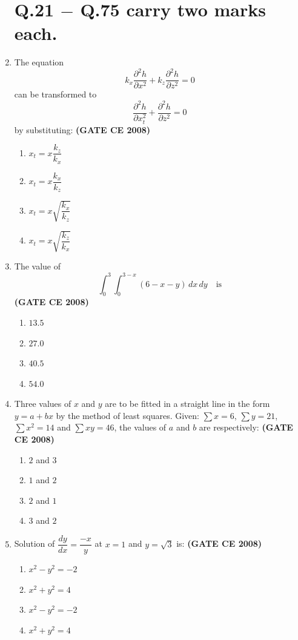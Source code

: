 \documentclass[journal]{IEEEtran}
\begin{document}
\begin{enumerate}
\section*{Q.21 $-$ Q.75 carry two marks each.}

\item The equation 
\[
k_x \frac{\partial^2 h}{\partial x^2} + k_z \frac{\partial^2 h}{\partial z^2} = 0
\]
can be transformed to \[
\frac{\partial^2 h}{\partial x_t^2} + \frac{\partial^2 h}{\partial z^2} = 0
\]
by substituting: \textbf{(GATE CE 2008)}
\begin{multicols}{2}
\begin{enumerate}
\item $x_t = x \dfrac{k_z}{k_x}$
\item $x_t = x \dfrac{k_x}{k_z}$
\item $x_t = x \sqrt{\dfrac{k_x}{k_z}}$
\item $x_t = x \sqrt{\dfrac{k_z}{k_x}}$
\end{enumerate}
\end{multicols}

\item The value of 
\[
\int_0^3 \int_0^{3-x} (6 - x - y) \, dx \, dy \quad \text{is}
\]
\textbf{(GATE CE 2008)}
\begin{multicols}{2}
\begin{enumerate}
\item $13.5$
\item $27.0$
\item $40.5$
\item $54.0$
\end{enumerate}
\end{multicols}

\item Three values of $x$ and $y$ are to be fitted in a straight line in the form $y = a + bx$ by the method of least squares. Given: $\sum x = 6$, $\sum y = 21$, $\sum x^2 = 14$ and $\sum xy = 46$, the values of $a$ and $b$ are respectively: \textbf{(GATE CE 2008)}
\begin{multicols}{2}
\begin{enumerate}
\item $2$ and $3$
\item $1$ and $2$
\item $2$ and $1$
\item $3$ and $2$
\end{enumerate}
\end{multicols}

\item Solution of $\dfrac{dy}{dx} = \dfrac{-x}{y}$ at $x = 1$ and $y = \sqrt{3}$ is: \textbf{(GATE CE 2008)}
\begin{multicols}{2}
\begin{enumerate}
\item $x^2 - y^2 = -2$
\item $x^2 + y^2 = 4$
\item $x^2 - y^2 = -2$
\item $x^2 + y^2 = 4$
\end{enumerate}
\end{multicols}


\end{enumerate}
\end{document}
